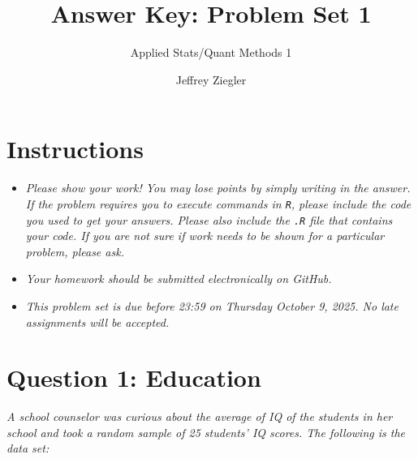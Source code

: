 \documentclass[12pt,letterpaper]{article}
\title{Answer Key: Problem Set 1}
\date{Jeffrey Ziegler}
\author{Applied Stats/Quant Methods 1}
\begin{document}
	\maketitle
	
	\section*{Instructions}
\begin{itemize}
	\item \textit{Please show your work! You may lose points by simply writing in the answer. If the problem requires you to execute commands in \texttt{R}, please include the code you used to get your answers. Please also include the \texttt{.R} file that contains your code. If you are not sure if work needs to be shown for a particular problem, please ask.}
	\item \textit{Your homework should be submitted electronically on GitHub.}
	\item \textit{This problem set is due before 23:59 on Thursday October 9, 2025. No late assignments will be accepted.}

\end{itemize}

\vspace{1cm}
\section*{Question 1: Education}

\textit{A school counselor was curious about the average of IQ of the students in her school and took a random sample of 25 students' IQ scores. The following is the data set:}\\
\vspace{.25cm}

  

\vspace{.5cm}
\end{document}
